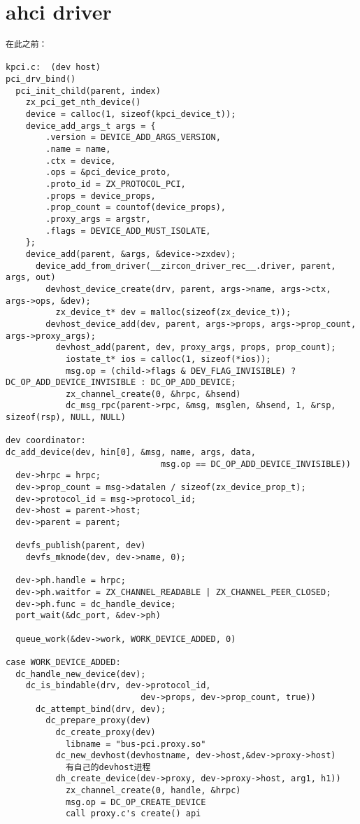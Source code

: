 \section{ahci driver}

\begin{verbatim}
在此之前：

kpci.c:  (dev host)
pci_drv_bind()
  pci_init_child(parent, index)
    zx_pci_get_nth_device()
    device = calloc(1, sizeof(kpci_device_t));
    device_add_args_t args = {
        .version = DEVICE_ADD_ARGS_VERSION,
        .name = name,
        .ctx = device,
        .ops = &pci_device_proto,
        .proto_id = ZX_PROTOCOL_PCI,
        .props = device_props,
        .prop_count = countof(device_props),
        .proxy_args = argstr,
        .flags = DEVICE_ADD_MUST_ISOLATE,
    };
    device_add(parent, &args, &device->zxdev);
      device_add_from_driver(__zircon_driver_rec__.driver, parent, args, out)
        devhost_device_create(drv, parent, args->name, args->ctx, args->ops, &dev);
          zx_device_t* dev = malloc(sizeof(zx_device_t));
        devhost_device_add(dev, parent, args->props, args->prop_count, args->proxy_args);
          devhost_add(parent, dev, proxy_args, props, prop_count);
            iostate_t* ios = calloc(1, sizeof(*ios));
            msg.op = (child->flags & DEV_FLAG_INVISIBLE) ? DC_OP_ADD_DEVICE_INVISIBLE : DC_OP_ADD_DEVICE;
            zx_channel_create(0, &hrpc, &hsend)
            dc_msg_rpc(parent->rpc, &msg, msglen, &hsend, 1, &rsp, sizeof(rsp), NULL, NULL)

dev coordinator:
dc_add_device(dev, hin[0], &msg, name, args, data,
                               msg.op == DC_OP_ADD_DEVICE_INVISIBLE))
  dev->hrpc = hrpc;
  dev->prop_count = msg->datalen / sizeof(zx_device_prop_t);
  dev->protocol_id = msg->protocol_id;
  dev->host = parent->host;
  dev->parent = parent;

  devfs_publish(parent, dev)
    devfs_mknode(dev, dev->name, 0);
    
  dev->ph.handle = hrpc;
  dev->ph.waitfor = ZX_CHANNEL_READABLE | ZX_CHANNEL_PEER_CLOSED;
  dev->ph.func = dc_handle_device;
  port_wait(&dc_port, &dev->ph)

  queue_work(&dev->work, WORK_DEVICE_ADDED, 0)

case WORK_DEVICE_ADDED:
  dc_handle_new_device(dev);
    dc_is_bindable(drv, dev->protocol_id,
                           dev->props, dev->prop_count, true))
      dc_attempt_bind(drv, dev);
        dc_prepare_proxy(dev)
          dc_create_proxy(dev)
            libname = "bus-pci.proxy.so"
          dc_new_devhost(devhostname, dev->host,&dev->proxy->host) 
            有自己的devhost进程
          dh_create_device(dev->proxy, dev->proxy->host, arg1, h1))
            zx_channel_create(0, handle, &hrpc)
            msg.op = DC_OP_CREATE_DEVICE
            call proxy.c's create() api


\end{verbatim}
